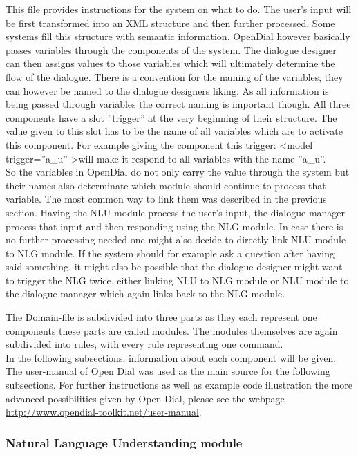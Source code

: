 \documentclass[a4paper, 12pt]{article}
\begin{document}
This file provides instructions for the system on what to do.
The user's input will be first transformed into an XML structure and then further processed.
Some systems fill this structure with semantic information.
OpenDial however basically passes variables through the components of the system.
The dialogue designer can then assigns values to those variables which will ultimately determine the flow of the dialogue.
There is a convention for the naming of the variables, they can however be named to the dialogue designers liking.
As all information is being passed through variables the correct naming is important though.
All three components have a slot ”trigger” at the very beginning of their structure.
The value given to this slot has to be the name of all variables which are to activate this component.
For example giving the component this trigger:
\textless model trigger=”a\_u” \textgreater will make it respond to all variables with the name ”a\_u”. \\


So the variables in OpenDial do not only carry the value through the system but their names also determinate which module should continue to process that variable.
The most common way to link them was described in the previous section.
Having the NLU module process the user's input, the dialogue manager process that input and then responding using the NLG module.
In case there is no further processing needed one might also decide to directly link NLU module to NLG module.
If the system should for example ask a question after having said something, it might also be possible that the dialogue designer might want to trigger the NLG twice, either linking NLU to NLG module or NLU module to the dialogue manager which again links back to the NLG module.


The Domain-file is subdivided into three parts as they each represent one components these parts are called modules.
The modules themselves are again subdivided into rules, with every rule representing one command.\\

In the following subsections, information about each component will be given.
The user-manual of Open Dial \cite{OpenDial} was used as the main source for the following subsections.
For further instructions as well as example code illustration the more advanced possibilities given by Open Dial, please see the webpage \url{http://www.opendial-toolkit.net/user-manual}.

\subsubsection{Natural Language Understanding module}
\end{document}
